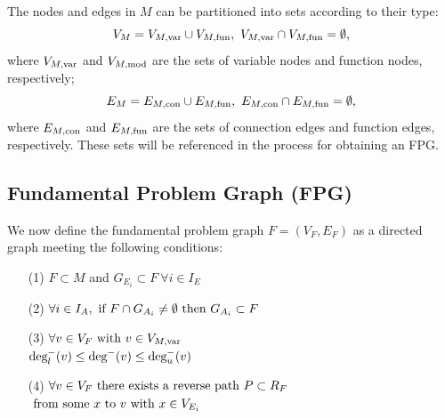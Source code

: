 The nodes and edges in $M$ can be partitioned into sets according to their type:
\begin{equation}
V_M = V_{M,\txt{var}} \cup V_{M,\txt{fun}}, \ V_{M,\txt{var}} \cap V_{M,\txt{fun}} = \emptyset,
\end{equation}
where $V_{M,\textrm{var}}$ and $V_{M,\textrm{mod}}$ are the sets of variable nodes and function nodes, respectively;
\begin{equation}
E_M = E_{M,\textrm{con}} \cup E_{M,\textrm{fun}}, \ E_{M,\textrm{con}} \cap E_{M,\textrm{fun}} = \emptyset,
\end{equation}
where $ E_{M,\textrm{con}}$ and $E_{M,\textrm{fun}}$ are the sets of connection edges and function edges, respectively. These sets will be referenced in the process for obtaining an FPG.

\subsection{Fundamental Problem Graph (FPG)}
    \label{ss:FPG}
    We now define the fundamental problem graph $F=(V_F,E_F)$ as a directed graph meeting the following conditions:
    \begin{enumerate}
    \item[(1)] $F \subset M$ and $G_{E_i} \subset F  \ \forall i \in I_E$
    \item[(2)] $\displaystyle{\forall i \in I_A, \textrm{ if } F \cap G_{A_i} \neq \emptyset \textrm{ then } G_{A_i} \subset F}$
    \item[(3)] $\displaystyle{\forall v \in V_F \textrm{ with }v \in V_{M,\textrm{var}}}$ \\
			 $\displaystyle{ \textrm{deg}_l^-(v) \leq \textrm{deg}^-(v) \leq \textrm{deg}_u^-(v)}$
    \item[(4)] $\displaystyle{\forall v \in V_F \textrm{ there exists a reverse path } P \subset R_F }$ \\
			$\displaystyle{\textrm{ from some } x \textrm{ to } v \textrm{ with } x\in V_{E_i}}$
    \end{enumerate}
